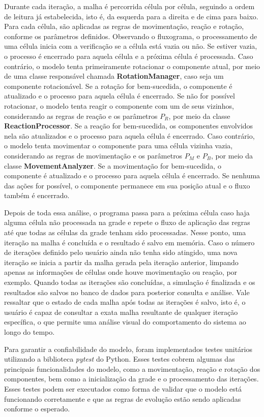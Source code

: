 \documentclass[12pt,oneside]{report}
\begin{document}
Durante cada iteração, a malha é percorrida célula por célula, seguindo a ordem de leitura já estabelecida, isto é, da esquerda para a direita e de cima para baixo. Para cada célula, são aplicadas as regras de movimentação, reação e rotação, conforme os parâmetros definidos. Observando o fluxograma, o processamento de uma célula inicia com a verificação se a célula está vazia ou não. Se estiver vazia, o processo é encerrado para aquela célula e a próxima célula é processada. Caso contrário, o modelo tenta primeiramente rotacionar o componente atual, por meio de uma classe responsável chamada \textbf{RotationManager}, caso seja um componente rotacionável. Se a rotação for bem-sucedida, o componente é atualizado e o processo para aquela célula é encerrado. Se não for possível rotacionar, o modelo tenta reagir o componente com um de seus vizinhos, considerando as regras de reação e os parâmetros $P_R$, por meio da classe \textbf{ReactionProcessor}. Se a reação for bem-sucedida, os componentes envolvidos nela são atualizados e o processo para aquela célula é encerrado. Caso contrário, o modelo tenta movimentar o componente para uma célula vizinha vazia, considerando as regras de movimentação e os parâmetros $P_M$ e $P_B$, por meio da classe \textbf{MovementAnalyzer}. Se a movimentação for bem-sucedida, o componente é atualizado e o processo para aquela célula é encerrado. Se nenhuma das ações for possível, o componente permanece em sua posição atual e o fluxo também é encerrado.

Depois de toda essa análise, o programa passa para a próxima célula caso haja alguma célula não processada na grade e repete o fluxo de aplicação das regras até que todas as células da grade tenham sido processadas. Nesse ponto, uma iteração na malha é concluída e o resultado é salvo em memória. Caso o número de iterações definido pelo usuário ainda não tenha sido atingido, uma nova iteração se inicia a partir da malha gerada pela iteração anterior, limpando apenas as informações de células onde houve movimentação ou reação, por exemplo. Quando todas as iterações são concluídas, a simulação é finalizada e os resultados são salvos no banco de dados para posterior consulta e análise. Vale ressaltar que o estado de cada malha após todas as iterações é salvo, isto é, o usuário é capaz de consultar a exata malha resultante de qualquer iteração específica, o que permite uma análise visual do comportamento do sistema ao longo do tempo.

Para garantir a confiabilidade do modelo, foram implementados testes unitários utilizando a biblioteca \textit{pytest} do Python. Esses testes cobrem algumas das principais funcionalidades do modelo, como a movimentação, reação e rotação dos componentes, bem como a inicialização da grade e o processamento das iterações. Esses testes podem ser executados como forma de validar que o modelo está funcionando corretamente e que as regras de evolução estão sendo aplicadas conforme o esperado.
\end{document}
